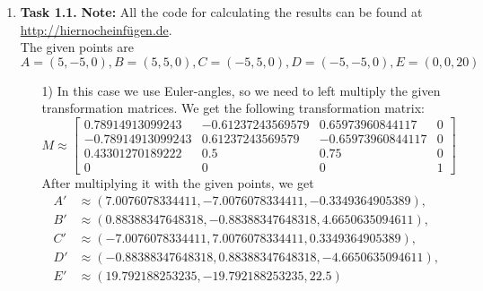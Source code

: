 \documentclass[a4paper,11pt]{article}
\author{\authorinfo}
\title{\titleinfo}
\date{\today}
\begin{document}
\maketitle
\begin {enumerate}
\item[\textbf{Task 1.1.}]
	\textbf{Note:} All the code for calculating the results can be found at \url{http://hiernocheinfügen.de}.\\
	The given points are $A = (5, -5, 0), B = (5, 5, 0), C = (-5, 5, 0), D = (-5, -5, 0), E = (0, 0, 20)$
    \begin{enumerate}
        \item[1)] In this case we use Euler-angles, so we need to left multiply the given transformation matrices. We get the following transformation matrix:
		$$M \approx \begin{bmatrix}
			0.78914913099243 & -0.61237243569579 & 0.65973960844117 & 0\\
-0.78914913099243 & 0.61237243569579 & -0.65973960844117 & 0\\
0.43301270189222 & 0.5 & 0.75 & 0\\
0 & 0 & 0	 & 1
		\end{bmatrix}$$
		After multiplying it with the given points, we get
		\begin{align*}
			A' &\approx (7.0076078334411, -7.0076078334411, -0.3349364905389),\\
			B' &\approx (0.88388347648318, -0.88388347648318, 4.6650635094611),\\
			C' &\approx (-7.0076078334411, 7.0076078334411, 0.3349364905389),\\
			D' &\approx (-0.88388347648318, 0.88388347648318, -4.6650635094611),\\
			E' &\approx (19.792188253235, -19.792188253235, 22.5)
		\end{align*}


\end{enumerate}
\end{enumerate}
\end{document}
